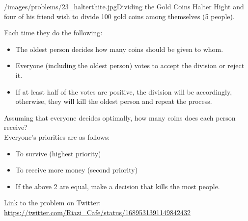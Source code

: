 \begin{problem}{/images/problems/23_halterthite.jpg}{Dividing the Gold Coins}
Halter Hight and four of his friend wish to divide 100 gold coins among themselves (5 people).

Each time they do the following:
\begin{itemize}
\item The oldest person decides how many coins should be given to whom.
\item Everyone (including the oldest person) votes to accept the division or reject it.
\item If at least half of the votes are positive, the division will be accordingly, otherwise, they will kill the oldest person and repeat the process.
\end{itemize}
Assuming that everyone decides optimally, how many coins does each person receive?\\[0.2cm]

Everyone's priorities are as follows:
\begin{itemize}
\item To survive (highest priority)
\item To receive more money (second priority)
\item If the above 2 are equal, make a decision that kills the most people.
\end{itemize}

Link to the problem on Twitter:  \url{https://twitter.com/Riazi_Cafe/status/1689531391149842432}\end{problem}
